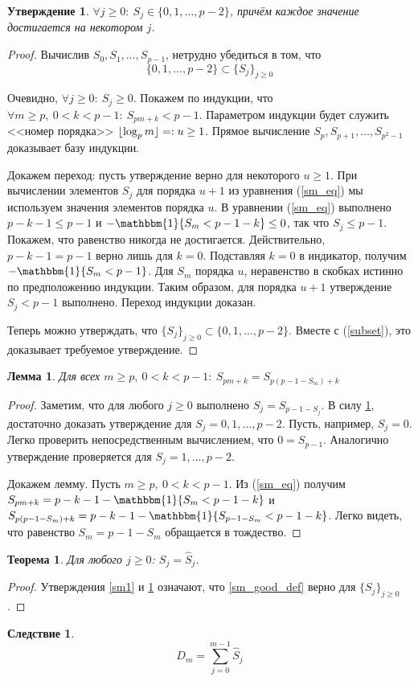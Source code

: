 \documentclass[14pt, a4paper, russian]{report}
\DeclarePairedDelimiter\floor{\lfloor}{\rfloor}
\newtheorem{lemma}{\indent Лемма}
\newtheorem{theorem}{\indent Теорема}
\newtheorem{corollary}{\indent Следствие}
\newtheorem{proposition}{\indent Утверждение}
\begin{document}
\begin{proposition} \label{sm_estimate}
$\forall j \ge 0:\ S_j \in \{0, 1, \ldots, p-2\}$, причём каждое значение достигается на некотором $j$.
\end{proposition}
\begin{proof}
Вычислив $S_0, S_1, \ldots, S_{p-1}$, нетрудно убедиться в том, что
\begin{equation}\label{subset}
\{0,1,\ldots,p-2\} \subset \{S_j\}_{j \ge 0}
\end{equation}

Очевидно, $\forall j \ge 0:\ S_j \ge 0$.
Покажем по индукции, что $\forall m \ge p,\ 0 < k < p-1:\ S_{pm+k} < p-1$. Параметром индукции будет служить <<номер порядка>> $\floor{\log_p m} =: u \ge 1$. Прямое вычисление $S_p, S_{p+1}, \ldots, S_{p^2-1}$ доказывает базу индукции.

Докажем переход: пусть утверждение верно для некоторого $u \ge 1$. При вычислении элементов $S_j$ для порядка $u+1$ из уравнения (\ref{sm_eq}) мы используем значения элементов порядка $u$. В уравнении (\ref{sm_eq}) выполнено $p-k-1 \le p-1$ и $-\mathbbm{1}\{S_m < p-1-k\} \le 0$, так что $S_j \le p-1$. Покажем, что равенство никогда не достигается. Действительно, $p-k-1 = p-1$ верно лишь для $k=0$. Подставляя $k=0$ в индикатор, получим $- \mathbbm{1}\{S_m < p-1\}$. Для $S_m$ порядка $u$, неравенство в скобках истинно по предположению индукции. Таким образом, для порядка $u+1$ утверждение $S_j < p-1$ выполнено. Переход индукции доказан.

Теперь можно утверждать, что $\{S_j\}_{j \ge 0} \subset \{0,1,\ldots,p-2\}$. Вместе с (\ref{subset}), это доказывает требуемое утверждение.
\end{proof}
\begin{lemma} \label{sm2}
Для всех $m \ge p,\ 0 < k < p-1:\ S_{pm+k}=S_{p(p-1-S_m)+k}$
\end{lemma}
\begin{proof}
Заметим, что для любого $j \ge 0$ выполнено $S_j = S_{p-1 - S_j}$. В силу \cref{sm_estimate}, достаточно доказать утверждение для $S_j=0,1,\ldots,p-2$. Пусть, например, $S_j=0$. Легко проверить непосредственным вычислением, что $0 = S_{p-1}$. Аналогично утверждение проверяется для $S_j=1,\ldots,p-2$.

Докажем лемму. Пусть $m \ge p,\ 0 < k < p-1$. Из (\ref{sm_eq}) получим $S_{pm+k}=p-k-1 - \mathbbm{1}\{S_m < p-1-k\}$ и $S_{p(p-1-S_m)+k}= p-k-1 - \mathbbm{1}\{S_{p-1-S_m} < p-1-k\}$. Легко видеть, что равенство $S_m=p-1-S_m$ обращается в тождество.
\end{proof}
\begin{theorem} \label{subst_th}
Для любого $j \ge 0$: $S_j=\hat{S}_j$.
\end{theorem}
\begin{proof}
Утверждения \cref{sm1} и \cref{sm2} означают, что \cref{sm_good_def} верно для $\{S_j\}_{j \ge 0}$.
\end{proof}
\begin{corollary}
$$D_m = \sum\limits_{j=0}^{m-1} \hat{S}_j$$
\end{corollary}
\end{document}
